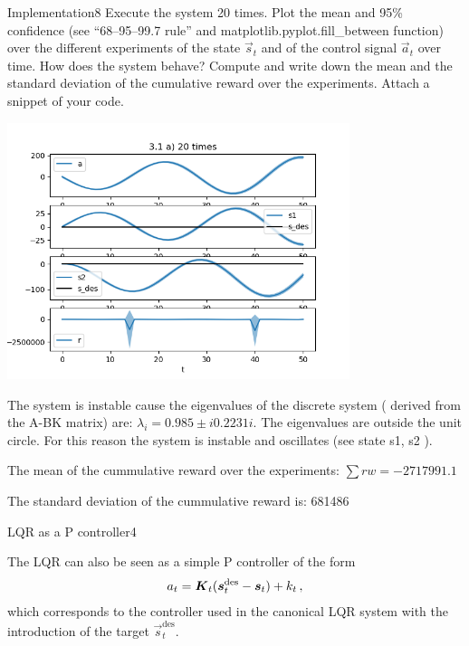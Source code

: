 \begin{questions}
\begin{question}{Implementation}{8}
	Execute the system 20 times.
	Plot the mean and 95\% confidence (see ``68--95--99.7 rule'' and matplotlib.pyplot.fill\_between function) over the different experiments of the state $\vec s_t$ and of the control signal $\vec a_t$ over time. 
	How does the system behave? 
	Compute and write down the mean and the standard deviation of the cumulative reward over the experiments. 
	Attach a snippet of your code.
	
\begin{answer}
	
\begin{center}
	\includegraphics[width=0.75\textwidth]{img/1a_20.png}
\end{center}

The system is instable cause the eigenvalues of the discrete system ( derived from the A-BK matrix) are: $\lambda_i = 0.985 \pm i 0.2231 i$. The eigenvalues are outside the unit circle. For this reason the system is instable and  oscillates (see state s1, s2 ).

The mean of the  cummulative reward over the experiments:  $\sum rw = -2717991.1$

The standard deviation of the cummulative reward is: 681486


	
\end{answer}


\end{question}


\begin{question}{LQR as a P controller}{4}

	The LQR can also be seen as a simple P controller of the form
	\begin{align}
		a_t = {\boldsymbol{K}}_t ({\boldsymbol{s}}^\text{des}_t - {\boldsymbol{s}}_t) + k_t\,,
	\end{align}
	which corresponds to the controller used in the canonical LQR system with the introduction of the target $\vec s^\text{des}_t$.
	

\end{question}
\end{questions}
